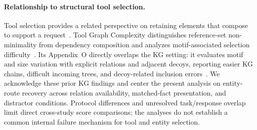 \paragraph{Relationship to structural tool selection.}
Tool selection provides a related perspective on retaining elements that compose to support a request~\cite{anonymousToolGraph}. Tool Graph Complexity distinguishes reference-set non-minimality from dependency composition and analyzes motif-associated selection difficulty~\cite{anonymousToolGraph}. Its Appendix~O directly overlaps the KG setting: it evaluates motif and size variation with explicit relations and adjacent decoys, reporting easier KG chains, difficult incoming trees, and decoy-related inclusion errors~\cite{anonymousToolGraph}. We acknowledge these prior KG findings and center the present analysis on entity-route recovery across relation availability, matched-fact presentation, and distractor conditions. Protocol differences and unresolved task/response overlap limit direct cross-study score comparisons; the analyses do not establish a common internal failure mechanism for tool and entity selection.
